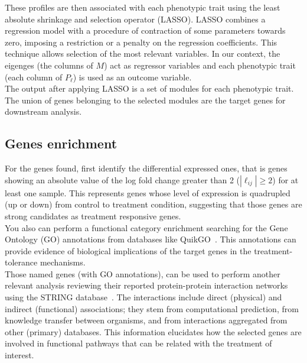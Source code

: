 \documentclass[12pt,journal, onecolumn]{IEEEtran}
\begin{document}

These profiles are then associated with each phenotypic trait using the least absolute shrinkage and selection operator (LASSO). LASSO combines a regression model with a procedure of contraction of some parameters towards zero, imposing a restriction or a penalty on the regression coefficients. This technique allows selection of the most relevant variables. In our context, the eigenges (the columns of $M$) act as regressor variables and each phenotypic trait (each column of $P_\ell$) is used as an outcome variable. \\

The output after applying LASSO is a set of modules for each phenotypic trait. The union of genes belonging to the selected modules are the target genes for downstream analysis.

\subsection{Genes enrichment}

For the genes found, first identify the differential expressed ones, that is genes showing an absolute value of the log fold change greater than 2 ($|\ell_{ij}|\geq 2$) for at least one sample. This represents genes whose level of expression is quadrupled (up or down) from control to treatment condition, suggesting that those genes are strong candidates as treatment responsive genes.\\

You also can perform a functional category enrichment searching for the Gene Ontology (GO) annotations from databases like QuikGO~\cite{binns2009quickgo}. This annotations can provide evidence of biological implications of the target genes in the treatment-tolerance mechanisms.\\

Those named genes (with GO annotations), can be used to perform another relevant analysis reviewing their reported protein-protein interaction networks using the STRING database~\cite{szklarczyk2016string}. The interactions include direct (physical) and indirect (functional) associations; they stem from computational prediction, from knowledge transfer between organisms, and from interactions aggregated from other (primary) databases. This information elucidates how the selected genes are involved in functional pathways that can be related with the treatment of interest.\\
\end{document}

